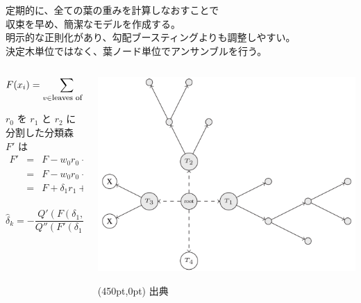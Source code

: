 \begin{tcolorbox}[title={\Large Regularized Greedy Forest}]
	定期的に、全ての葉の重みを計算しなおすことで \\
	収束を早め、簡潔なモデルを作成する。 \\
	明示的な正則化があり、勾配ブースティングよりも調整しやすい。 \\
	決定木単位ではなく、葉ノード単位でアンサンブルを行う。 \\

	\begin{columns}
		\begin{column}{0.50\hsize}
			\[ F(x_i) = \sum_{v \in \mbox{\footnotesize leaves of }F} w_v r_v \]

			\vspace{50px}
			$r_0$ を $r_1$ と $r_2$ に分割した分類森 $F'$ は
			\begin{eqnarray*}
				F'
				&=& F - w_0 r_0 + w_1 r_1 + w_2 r_2  \\
				&=& F - w_0 r_0 + (w_0 + \delta_1) r_1 + (w_0 + \delta_1) r_2  \\
				&=& F + \delta_1 r_1 + \delta_2 r_2  \\
			\end{eqnarray*}

			\vspace{-70px}
			\[ \hat{\delta}_k = - \frac{Q'(F(\delta_1, \delta_2))}{Q''(F'(\delta_1, \delta_2))} \mid_{\delta_1=0, \delta_2=0} \]

		\end{column}
		\begin{column}{0.50\hsize}
			\includegraphics[width=1.0\textwidth]{img/rgf.png}
			\begin{textblock*}{\textwidth}(450pt,0pt)
				{\footnotesize 出典\cite{rgf}}
			\end{textblock*}
		\end{column}
	\end{columns}


\end{tcolorbox}
